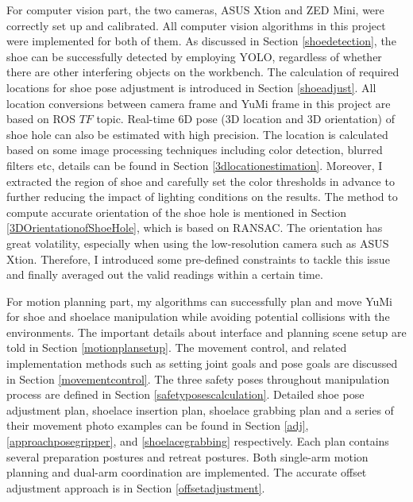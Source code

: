 For computer vision part, the two cameras, ASUS Xtion and ZED Mini, were correctly set up and calibrated. All computer vision algorithms in this project were implemented for both of them. As discussed in Section \ref{shoedetection}, the shoe can be successfully detected by employing YOLO, regardless of whether there are other interfering objects on the workbench. The calculation of required locations for shoe pose adjustment is introduced in Section \ref{shoeadjust}. All location conversions between camera frame and YuMi frame in this project are based on ROS $TF$ topic. Real-time 6D pose (3D location and 3D orientation) of shoe hole can also be estimated with high precision. The location is calculated based on some image processing techniques including color detection, blurred filters etc, details can be found in Section \ref{3dlocationestimation}. Moreover, I extracted the region of shoe and carefully set the color thresholds in advance to further reducing the impact of lighting conditions on the results. The method to compute accurate orientation of the shoe hole is mentioned in Section \ref{3DOrientationofShoeHole}, which is based on RANSAC. The orientation has great volatility, especially when using the low-resolution camera such as ASUS Xtion. Therefore, I introduced some pre-defined constraints to tackle this issue and finally averaged out the valid readings within a certain time.

For motion planning part, my algorithms can successfully plan and move YuMi for shoe and shoelace manipulation while avoiding potential collisions with the environments. The important details about interface and planning scene setup are told in Section \ref{motionplansetup}. The movement control, and related implementation methods such as setting joint goals and pose goals are discussed in Section \ref{movementcontrol}. The three safety poses throughout manipulation process are defined in Section \ref{safetyposescalculation}. Detailed shoe pose adjustment plan, shoelace insertion plan, shoelace grabbing plan and a series of their movement photo examples can be found in Section \ref{adj}, \ref{approachposegripper}, and \ref{shoelacegrabbing} respectively. Each plan contains several preparation postures and retreat postures. Both single-arm motion planning and dual-arm coordination are implemented. The accurate offset adjustment approach is in Section \ref{offsetadjustment}.

